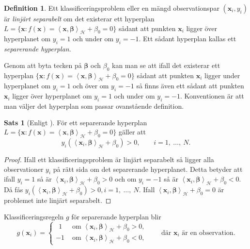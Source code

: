 \documentclass[a4paper, 12pt]{report}
\theoremstyle{definition}
\newtheorem{thm}{Sats}[section]
\newtheorem{defi}{Definition}[section]
\theoremstyle{remark}
\newtheorem*{rem}{Observation}
\newcommand{\bfbeta}{{\boldsymbol{\beta}}}
\newcommand{\bfx}{\mathbf{x}}
\newcommand{\llangle}{\left\langle}
\newcommand{\rrangle}{\right\rangle}
\newcommand{\sephyp}{\{ \mathbf{x} : f\left(\mathbf{x}\right)=\inner{\bfx}{\bfbeta}_\mathcal{H} + \beta_0=0\}}
\newcommand{\inner}[2]{\llangle #1, #2 \rrangle}
\newcommand{\hil}{\mathcal{H}}
\begin{document}
\begin{defi}
	Ett klassificeringsproblem eller en mängd observationspar $\left(\mathbf{x}_i, y_i\right)$ är \textit{linjärt separabelt} om det existerar ett hyperplan $L=\sephyp$ sådant att punkten $\bfx_i$ ligger över hyperplanet om $y_i=1$ och under om $y_i=-1$. Ett sådant hyperplan kallas ett \emph{separerande hyperplan}.
\end{defi}
	Genom att byta tecken på $\bfbeta$ och $\beta_0$ kan man se att ifall det existerar ett hyperplan $\sephyp$ sådant att punkten $\bfx_i$ ligger under hyperplanet om $y_i=1$ och över om $y_i=-1$ så finns även ett sådant att punkten $\bfx_i$ ligger över hyperplanet om $y_i=1$ och under om $y_i=-1$.
	Konventionen är att man väljer det hyperplan som passar ovanstående definition.
\begin{thm}[Enligt \cite{Boyd}]\label{thm:sephyppositive}
	För ett separerande hyperplan $L=\sephyp$ gäller att 
	\begin{equation*}
		y_i\left(\inner{\bfx_i}{\bfbeta}_\hil + \beta_0\right) > 0, \qquad i = 1,~\dots,~N.
	\end{equation*}
\end{thm}
\begin{proof}
	Ifall ett klassificeringsproblem är linjärt separabelt så ligger alla observationer $y_i$ på rätt sida om det separerande hyperplanet. Detta betyder att ifall $y_i=1$ så är $\inner{\bfx_i}{\bfbeta}_\hil + \beta_0 > 0$ och om $y_i=-1$ så är $\inner{\bfx_i}{\bfbeta}_\hil + \beta_0 < 0$.
	Då fås $y_i\left(\inner{\bfx_i}{\bfbeta}_\hil + \beta_0\right) > 0,i = 1,~\dots,~N.$ Ifall $\inner{\bfx_i}{\bfbeta}_\hil + \beta_0 = 0$ är problemet inte linjärt separabelt.
\end{proof}

Klassificeringsregeln $g$ för separerande hyperplan blir
\begin{equation*}
g\left(\mathbf{x}_i\right)=  
\begin{cases}
~~ 1 &\text{ om } \inner{\bfx_i}{\bfbeta}_\hil + \beta_0 > 0,\\
-1 &\text{ om } \inner{\bfx_i}{\bfbeta}_\hil + \beta_0 < 0,
\end{cases}\qquad\text{där }\bfx_i\text{ är en observation.}
\end{equation*}
\end{document}

